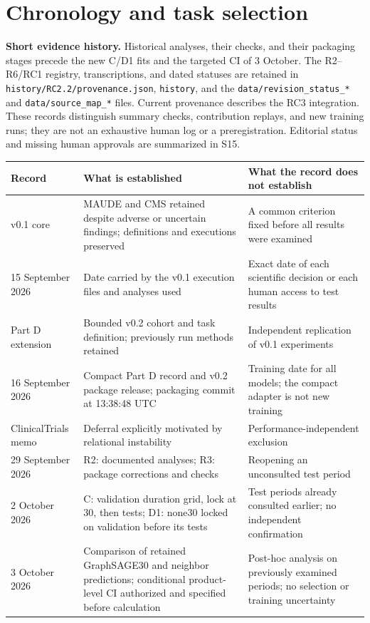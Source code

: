 \documentclass[10pt,a4paper]{article}
\newcommand{\src}[1]{{\small\nolinkurl{#1}}}
\begin{document}
\section{Chronology and task selection}
\label{supp:chronology}
\textbf{Short evidence history.} Historical analyses, their checks, and their packaging stages precede the new C/D1 fits and the targeted CI of 3 October. The R2--R6/RC1 registry, transcriptions, and dated statuses are retained in \src{history/RC2.2/provenance.json}, \src{history}, and the \src{data/revision_status_*} and \src{data/source_map_*} files. Current provenance describes the RC3 integration. These records distinguish summary checks, contribution replays, and new training runs; they are not an exhaustive human log or a preregistration. Editorial status and missing human approvals are summarized in S15.
\begin{tabularx}{\linewidth}{@{}p{30mm}Xp{39mm}@{}}
\toprule
Record & What is established & What the record does not establish\\
\midrule
v0.1 core & MAUDE and CMS retained despite adverse or uncertain findings; definitions and executions preserved & A common criterion fixed before all results were examined\\
15 September 2026 & Date carried by the v0.1 execution files and analyses used & Exact date of each scientific decision or each human access to test results\\
Part D extension & Bounded v0.2 cohort and task definition; previously run methods retained & Independent replication of v0.1 experiments\\
16 September 2026 & Compact Part D record and v0.2 package release; packaging commit at 13:38:48 UTC & Training date for all models; the compact adapter is not new training\\
ClinicalTrials memo & Deferral explicitly motivated by relational instability & Performance-independent exclusion\\
29 September 2026 & R2: documented analyses; R3: package corrections and checks & Reopening an unconsulted test period\\
2 October 2026 & C: validation duration grid, lock at 30, then tests; D1: none30 locked on validation before its tests & Test periods already consulted earlier; no independent confirmation\\
3 October 2026 & Comparison of retained GraphSAGE30 and neighbor predictions; conditional product-level CI authorized and specified before calculation & Post-hoc analysis on previously examined periods; no selection or training uncertainty\\
\bottomrule
\end{tabularx}
\end{document}
